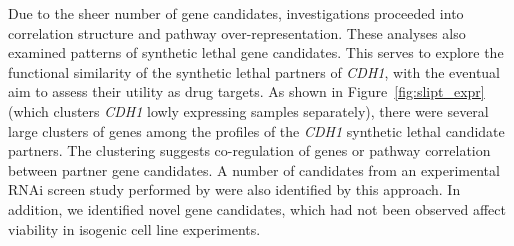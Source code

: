 Due to the sheer number of gene candidates, investigations proceeded into correlation structure and pathway over-represent\-ation. These analyses also examined  patterns of \gls{synthetic lethal} gene candidates. This serves to explore the functional similarity of the \gls{synthetic lethal} partners of \textit{CDH1}, with the eventual aim to assess their utility as drug targets. As shown in Figure~\ref{fig:slipt_expr} (which clusters \textit{CDH1} lowly expressing samples separately), there were several large clusters of genes among the   profiles of the \textit{CDH1} \gls{synthetic lethal} candidate partners. The clustering suggests co-regulation of genes or pathway correlation between partner gene candidates. A number of candidates from an experimental \gls{RNAi} screen study performed by \citet{Telford2015} were also identified by this approach. In addition, we identified novel gene candidates, which had not been observed affect viability in isogenic cell line experiments. %


